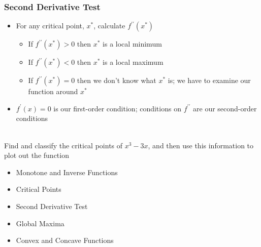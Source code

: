 \documentclass{beamer}
\numberwithin{equation}{section}
\begin{document}
\begin{frame}
\frametitle{Second Derivative Test}

\begin{itemize}
\item For any critical point, $x^*$, calculate $f^{\prime\prime}(x^*)$ \pause

\begin{itemize}
\item If $f^{\prime\prime}(x^*)>0$ then $x^*$ is a local minimum \pause
\item If $f^{\prime\prime}(x^*)<0$ then $x^*$ is a local maximum \pause

\item If $f^{\prime\prime}(x^*)=0$ then we don't know what $x^*$ is; we have to examine our function around $x^*$ \pause

\end{itemize}

\item $f^\prime(x)=0$ is our first-order condition; conditions on $f^{\prime\prime}$ are our second-order conditions \pause

\end{itemize}

\ \\Find and classify the critical points of $x^3-3x$, and then use this information to plot out the function

\end{frame}



\begin{frame}

\begin{itemize}
\item \textcolor{mygray}{Monotone and Inverse Functions}
\item \textcolor{mygray}{Critical Points}
\item \textcolor{mygray}{Second Derivative Test}
\item \textcolor{myblack}{Global Maxima}
\item \textcolor{mygray}{Convex and Concave Functions}
\end{itemize}

\end{frame}
\end{document}
